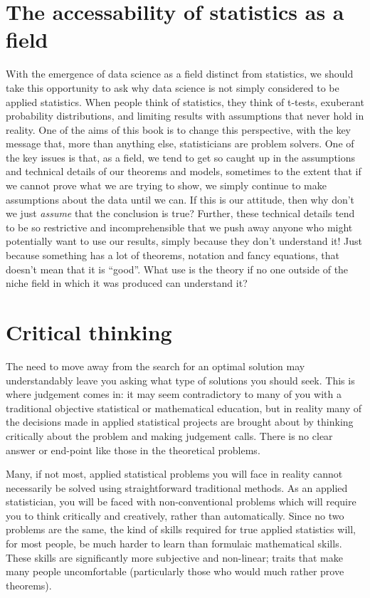 \section{The accessability of statistics as a field}

With the emergence of data science as a field distinct from statistics, we should take this opportunity to ask why data science is not simply considered to be applied statistics. When people think of statistics, they think of t-tests, exuberant probability distributions, and limiting results with assumptions that never hold in reality. One of the aims of this book is to change this perspective, with the key message that, more than anything else, statisticians are problem solvers. One of the key issues is that, as a field, we tend to get so caught up in the assumptions and technical details of our theorems and models, sometimes to the extent that if we cannot prove what we are trying to show, we simply continue to make assumptions about the data until we can. If this is our attitude, then why don't we just \emph{assume} that the conclusion is true? Further, these technical details tend to be so restrictive and incomprehensible that we push away anyone who might potentially want to use our results, simply because they don't understand it! Just because something has a lot of theorems, notation and fancy equations, that doesn't mean that it is ``good''. What use is the theory if no one outside of the niche field in which it was produced can understand it?



\section{Critical thinking}

The need to move away from the search for an optimal solution may understandably leave you asking what type of solutions you should seek. This is where judgement comes in: it may seem contradictory to many of you with a traditional objective statistical or mathematical education, but in reality many of the decisions made in applied statistical projects are brought about by thinking critically about the problem and making judgement calls. There is no clear answer or end-point like those in the theoretical problems.

Many, if not most, applied statistical problems you will face in reality cannot necessarily be solved using straightforward traditional methods. As an applied statistician, you will be faced with non-conventional problems which will require you to think critically and creatively, rather than automatically. Since no two problems are the same, the kind of skills required for true applied statistics will, for most people, be much harder to learn than formulaic mathematical skills. These skills are significantly more subjective and non-linear; traits that make many people uncomfortable (particularly those who would much rather prove theorems).

